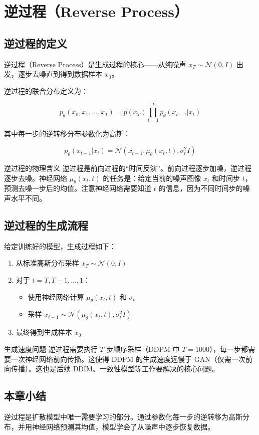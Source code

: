 \section{逆过程（Reverse Process）}

\subsection{逆过程的定义}

逆过程（Reverse Process）是生成过程的核心——从纯噪声 $x_T \sim \mathcal{N}(0, I)$ 出发，逐步去噪直到得到数据样本 $x_0$。

逆过程的联合分布定义为：

$$p_\theta(x_0, x_1, \ldots, x_T) = p(x_T) \prod_{t=1}^{T} p_\theta(x_{t-1} | x_t)$$

其中每一步的逆转移分布参数化为高斯：

$$p_\theta(x_{t-1} | x_t) = \mathcal{N}(x_{t-1}; \mu_\theta(x_t, t), \sigma_t^2 I)$$

\begin{importantbox}{逆过程的物理含义}
逆过程是前向过程的``时间反演''。前向过程逐步加噪，逆过程逐步去噪。神经网络 $\mu_\theta(x_t, t)$ 的任务是：给定当前的噪声图像 $x_t$ 和时间步 $t$，预测去噪一步后的均值。注意神经网络需要知道 $t$ 的信息，因为不同时间步的噪声水平不同。
\end{importantbox}

\subsection{逆过程的生成流程}

给定训练好的模型，生成过程如下：

\begin{enumerate}
    \item 从标准高斯分布采样 $x_T \sim \mathcal{N}(0, I)$
    \item 对于 $t = T, T-1, \ldots, 1$：
    \begin{itemize}
        \item 使用神经网络计算 $\mu_\theta(x_t, t)$ 和 $\sigma_t$
        \item 采样 $x_{t-1} \sim \mathcal{N}(\mu_\theta(x_t, t), \sigma_t^2 I)$
    \end{itemize}
    \item 最终得到生成样本 $x_0$
\end{enumerate}

\begin{warningbox}{生成速度问题}
逆过程需要执行 $T$ 步顺序采样（DDPM 中 $T = 1000$），每一步都需要一次神经网络前向传播。这使得 DDPM 的生成速度远慢于 GAN（仅需一次前向传播）。这也是后续 DDIM、一致性模型等工作要解决的核心问题。
\end{warningbox}

\subsection{本章小结}

逆过程是扩散模型中唯一需要学习的部分。通过参数化每一步的逆转移为高斯分布，并用神经网络预测其均值，模型学会了从噪声中逐步恢复数据。


